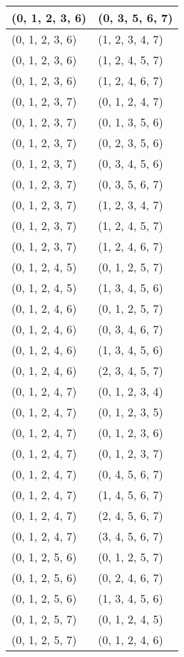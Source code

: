 \begin{footnotesize}
\begin{longtable}[c]{|l|l|}
\\ \hline
(0, 1, 2, 3, 6)
&(0, 3, 5, 6, 7)
\\ \hline
(0, 1, 2, 3, 6)
&(1, 2, 3, 4, 7)
\\ \hline
(0, 1, 2, 3, 6)
&(1, 2, 4, 5, 7)
\\ \hline
(0, 1, 2, 3, 6)
&(1, 2, 4, 6, 7)
\\ \hline
(0, 1, 2, 3, 7)
&(0, 1, 2, 4, 7)
\\ \hline
(0, 1, 2, 3, 7)
&(0, 1, 3, 5, 6)
\\ \hline
(0, 1, 2, 3, 7)
&(0, 2, 3, 5, 6)
\\ \hline
(0, 1, 2, 3, 7)
&(0, 3, 4, 5, 6)
\\ \hline
(0, 1, 2, 3, 7)
&(0, 3, 5, 6, 7)
\\ \hline
(0, 1, 2, 3, 7)
&(1, 2, 3, 4, 7)
\\ \hline
(0, 1, 2, 3, 7)
&(1, 2, 4, 5, 7)
\\ \hline
(0, 1, 2, 3, 7)
&(1, 2, 4, 6, 7)
\\ \hline
(0, 1, 2, 4, 5)
&(0, 1, 2, 5, 7)
\\ \hline
(0, 1, 2, 4, 5)
&(1, 3, 4, 5, 6)
\\ \hline
(0, 1, 2, 4, 6)
&(0, 1, 2, 5, 7)
\\ \hline
(0, 1, 2, 4, 6)
&(0, 3, 4, 6, 7)
\\ \hline
(0, 1, 2, 4, 6)
&(1, 3, 4, 5, 6)
\\ \hline
(0, 1, 2, 4, 6)
&(2, 3, 4, 5, 7)
\\ \hline
(0, 1, 2, 4, 7)
&(0, 1, 2, 3, 4)
\\ \hline
(0, 1, 2, 4, 7)
&(0, 1, 2, 3, 5)
\\ \hline
(0, 1, 2, 4, 7)
&(0, 1, 2, 3, 6)
\\ \hline
(0, 1, 2, 4, 7)
&(0, 1, 2, 3, 7)
\\ \hline
(0, 1, 2, 4, 7)
&(0, 4, 5, 6, 7)
\\ \hline
(0, 1, 2, 4, 7)
&(1, 4, 5, 6, 7)
\\ \hline
(0, 1, 2, 4, 7)
&(2, 4, 5, 6, 7)
\\ \hline
(0, 1, 2, 4, 7)
&(3, 4, 5, 6, 7)
\\ \hline
(0, 1, 2, 5, 6)
&(0, 1, 2, 5, 7)
\\ \hline
(0, 1, 2, 5, 6)
&(0, 2, 4, 6, 7)
\\ \hline
(0, 1, 2, 5, 6)
&(1, 3, 4, 5, 6)
\\ \hline
(0, 1, 2, 5, 7)
&(0, 1, 2, 4, 5)
\\ \hline
(0, 1, 2, 5, 7)
&(0, 1, 2, 4, 6)
\\ \hline

\end{longtable}
\end{footnotesize}
